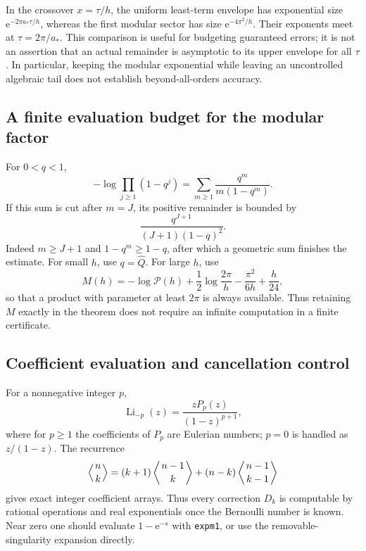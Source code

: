 \documentclass[11pt,a4paper]{article}
\numberwithin{equation}{section}
\theoremstyle{definition}\newtheorem{definition}[theorem]{Definition}
\theoremstyle{remark}\newtheorem{remark}[theorem]{Remark}
\DeclareMathOperator{\Li}{Li}
\newcommand{\e}{\mathrm e}
\newcommand{\amin}{a_*}
\newcommand{\calP}{\mathcal P}
\begin{document}
In the crossover $x=\tau/h$, the uniform least-term envelope has exponential
size $\e^{-2\pi\amin\tau/h}$, whereas the first modular sector has size
$\e^{-4\pi^2/h}$. Their exponents meet at $\tau=2\pi/\amin$. This comparison
is useful for budgeting guaranteed errors; it is not an assertion that an
actual remainder is asymptotic to its upper envelope for all $\tau$. In
particular, keeping the modular exponential while leaving an uncontrolled
algebraic tail does not establish beyond-all-orders accuracy.

\subsection{A finite evaluation budget for the modular factor}
For $0<q<1$,
\begin{equation}
 -\log\prod_{j\ge1}(1-q^j)
          =\sum_{m\ge1}\frac{q^m}{m(1-q^m)}.
\end{equation}
If this sum is cut after $m=J$, its positive remainder is bounded by
\begin{equation}
 \frac{q^{J+1}}{(J+1)(1-q)^2}.
 \label{eq:mod-tail-bound}
\end{equation}
Indeed $m\ge J+1$ and $1-q^m\ge1-q$, after which a geometric sum finishes
the estimate. For small $h$, use $q=\widehat Q$. For large $h$, use
\begin{equation}
 M(h)=-\log\calP(h)+\frac12\log\frac{2\pi}{h}
                  -\frac{\pi^2}{6h}+\frac h{24},
 \label{eq:M-switch}
\end{equation}
so that a product with parameter at least $2\pi$ is always available.
Thus retaining $M$ exactly in the theorem does not require an infinite
computation in a finite certificate.

\subsection{Coefficient evaluation and cancellation control}
For a nonnegative integer $p$,
\begin{equation}
 \Li_{-p}(z)=\frac{zP_p(z)}{(1-z)^{p+1}},
 \label{eq:Eulerian-poly}
\end{equation}
where for $p\ge1$ the coefficients of $P_p$ are Eulerian numbers; $p=0$ is
handled as $z/(1-z)$. The recurrence
\begin{equation}
 \left\langle\genfrac{}{}{0pt}{}{n}{k}\right\rangle
 =(k+1)\left\langle\genfrac{}{}{0pt}{}{n-1}{k}\right\rangle
 +(n-k)\left\langle\genfrac{}{}{0pt}{}{n-1}{k-1}\right\rangle
\end{equation}
gives exact integer coefficient arrays. Thus every correction $D_k$ is
computable by rational operations and real exponentials once the Bernoulli
number is known. Near zero one should evaluate $1-\e^{-s}$ with
\texttt{expm1}, or use the removable-singularity expansion directly.
\end{document}
